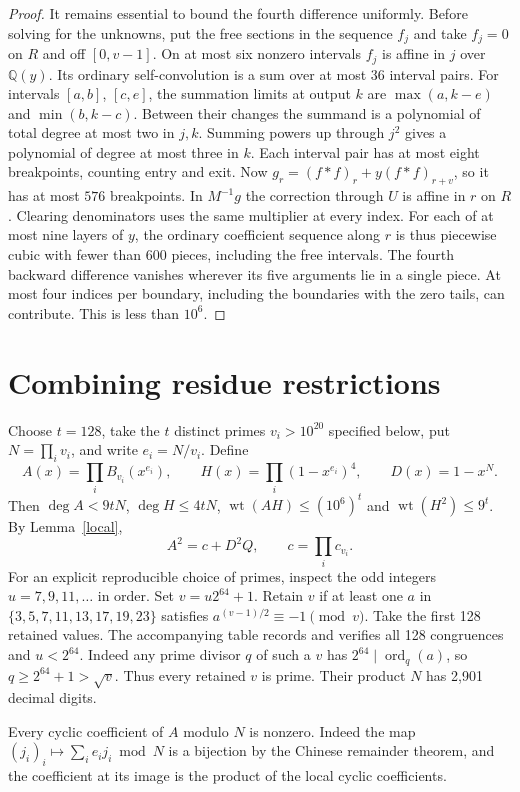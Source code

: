 \documentclass[11pt]{article}
\newcommand{\wt}{\operatorname{wt}}
\newcommand{\Q}{\mathbb Q}
\begin{document}
\begin{proof}
It remains essential to bound the fourth difference uniformly. Before solving for the unknowns, put the free sections in the sequence $f_j$ and take $f_j=0$ on $R$ and off $[0,v-1]$. On at most six nonzero intervals $f_j$ is affine in $j$ over $\Q(y)$. Its ordinary self-convolution is a sum over at most $36$ interval pairs. For intervals $[a,b]$, $[c,e]$, the summation limits at output $k$ are $\max(a,k-e)$ and $\min(b,k-c)$. Between their changes the summand is a polynomial of total degree at most two in $j,k$. Summing powers up through $j^2$ gives a polynomial of degree at most three in $k$. Each interval pair has at most eight breakpoints, counting entry and exit. Now $g_r=(f*f)_r+y(f*f)_{r+v}$, so it has at most $576$ breakpoints. In $M^{-1}g$ the correction through $U$ is affine in $r$ on $R$. Clearing denominators uses the same multiplier at every index. For each of at most nine layers of $y$, the ordinary coefficient sequence along $r$ is thus piecewise cubic with fewer than $600$ pieces, including the free intervals. The fourth backward difference vanishes wherever its five arguments lie in a single piece. At most four indices per boundary, including the boundaries with the zero tails, can contribute. This is less than $10^6$.
\end{proof}
\section{Combining residue restrictions}
Choose $t=128$, take the $t$ distinct primes $v_i>10^{20}$ specified below, put $N=\prod_i v_i$, and write $e_i=N/v_i$. Define
\[
 A(x)=\prod_i B_{v_i}(x^{e_i}),\qquad H(x)=\prod_i(1-x^{e_i})^4,\qquad D(x)=1-x^N.
\]
Then $\deg A<9tN$, $\deg H\leq4tN$, $\wt(AH)\leq(10^6)^t$ and $\wt(H^2)\leq9^t$. By Lemma~\ref{local},
\[
 A^2=c+D^2Q,\qquad c=\prod_i c_{v_i}.
\]
For an explicit reproducible choice of primes, inspect the odd integers $u=7,9,11,\ldots$ in order. Set $v=u2^{64}+1$. Retain $v$ if at least one $a$ in $\{3,5,7,11,13,17,19,23\}$ satisfies $a^{(v-1)/2}\equiv-1\pmod v$. Take the first 128 retained values. The accompanying table records and verifies all 128 congruences and $u<2^{64}$. Indeed any prime divisor $q$ of such a $v$ has $2^{64}\mid\operatorname{ord}_q(a)$, so $q\geq2^{64}+1>\sqrt v$. Thus every retained $v$ is prime. Their product $N$ has 2,901 decimal digits.

Every cyclic coefficient of $A$ modulo $N$ is nonzero. Indeed the map $(j_i)_i\mapsto\sum_i e_i j_i\bmod N$ is a bijection by the Chinese remainder theorem, and the coefficient at its image is the product of the local cyclic coefficients.
\end{document}
